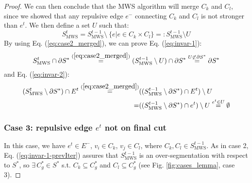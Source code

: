 \begin{proof}
We can then conclude that the MWS algorithm will merge $C_{k}$ and $C_{l}$, since we showed that any repulsive edge $e^{-}$ connecting $C_{k}$
and $C_{l}$ is not stronger than $e^{t}$. We then define a set $U$ such that:
\begin{equation}
S_{\mathrm{MWS}}^{t} = S_{\mathrm{MWS}}^{t-1} \setminus \ \{e | e \in C_k \times C_l\} =: S_{\mathrm{MWS}}^{t-1} \setminus U \label{eq:case2_merged}
\end{equation}
By using Eq. (\ref{eq:case2_merged}), we can prove Eq. (\ref{eq:invar-1}):
\begin{equation}
S_{\mathrm{MWS}}^{t} \cap \partial S^{*} \stackrel{(\ref{eq:case2_merged})}{=} (S_{\mathrm{MWS}}^{t-1} \setminus U) \cap\partial S^{*} \stackrel{U \not\subset \partial S^*}{=} \partial S^{*}
\end{equation}
and Eq. (\ref{eq:invar-2}):
\begin{align}
(S_{\mathrm{MWS}}^{t} \setminus \partial S^{*})\cap E^t \stackrel{(\ref{eq:case2_merged})}{=}& ((S_{\mathrm{MWS}}^{t-1} \setminus \partial S^{*}) \cap E^t )\setminus U \\
 =& ((S_{\mathrm{MWS}}^{t-1} \setminus \partial S^{*}) \cap e^t )\setminus U  \stackrel{e^t \in U}{=}  \emptyset
\end{align}

\subsubsection*{Case 3: repulsive edge $e^t$ not on final cut}
In this case, we have $e^{t}\in E^{-}$, $v_{i}\in C_{k}$,
$v_{j}\in C_{l}$, where $C_{k},C_{l}\in S_{\mathrm{MWS}}^{t-1}$. As in case 2, Eq. (\ref{eq:invar-1-prevIter}) assures that $S_{\mathrm{MWS}}^{t-1}$ is an over-segmentation with respect to $S^*$, so $\exists \,C^*_g \in S^*$ s.t. $C_k \subseteq C^*_g$ and $C_l \subseteq C^*_g$ (see Fig. \ref{fig:cases_lemma}, case 3).  


\end{proof}
